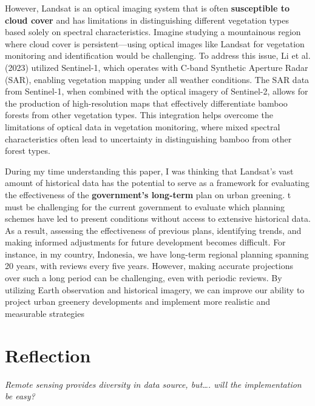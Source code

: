 \documentclass[
  letterpaper,
  DIV=11,
  numbers=noendperiod]{scrreprt}
\begin{document}
However, Landsat is an optical imaging system that is often
\textbf{susceptible to cloud cover} and has limitations in
distinguishing different vegetation types based solely on spectral
characteristics. Imagine studying a mountainous region where cloud cover
is persistent---using optical images like Landsat for vegetation
monitoring and identification would be challenging. To address this
issue, Li et al. (2023) utilized Sentinel-1, which operates with C-band
Synthetic Aperture Radar (SAR), enabling vegetation mapping under all
weather conditions. The SAR data from Sentinel-1, when combined with the
optical imagery of Sentinel-2, allows for the production of
high-resolution maps that effectively differentiate bamboo forests from
other vegetation types. This integration helps overcome the limitations
of optical data in vegetation monitoring, where mixed spectral
characteristics often lead to uncertainty in distinguishing bamboo from
other forest types.

During my time understanding this paper, I was thinking that Landsat's
vast amount of historical data has the potential to serve as a framework
for evaluating the effectiveness of the \textbf{government's long-term}
plan on urban greening. t must be challenging for the current government
to evaluate which planning schemes have led to present conditions
without access to extensive historical data. As a result, assessing the
effectiveness of previous plans, identifying trends, and making informed
adjustments for future development becomes difficult. For instance, in
my country, Indonesia, we have long-term regional planning spanning 20
years, with reviews every five years. However, making accurate
projections over such a long period can be challenging, even with
periodic reviews. By utilizing Earth observation and historical imagery,
we can improve our ability to project urban greenery developments and
implement more realistic and measurable strategies

\hypertarget{reflection}{%
\section{Reflection}\label{reflection}}

\emph{Remote sensing provides diversity in data source, but\ldots. will
the implementation be easy?}
\end{document}
